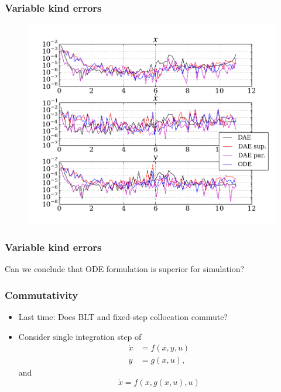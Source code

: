 \documentclass[]{beamer}
\begin{document}
\begin{frame}
\frametitle{Variable kind errors}
\begin{figure}[ht]
\centering
\includegraphics[width=0.9\linewidth]{errors.png}
\end{figure}
\end{frame}

\begin{frame}
\frametitle{Variable kind errors}
Can we conclude that ODE formulation is superior for simulation?
\end{frame}

\begin{frame}
\frametitle{Commutativity}
\begin{itemize}
\item
Last time: Does BLT and fixed-step collocation commute?
\item
Consider single integration step of
\begin{equation}
\begin{aligned}
\dot x &= f(x, y, u) \\
y &= g(x, u),
\end{aligned}
\end{equation}
and
\begin{equation}
\dot x = f(x, g(x, u), u)
\end{equation}
\end{itemize}
\end{frame}
\end{document}
